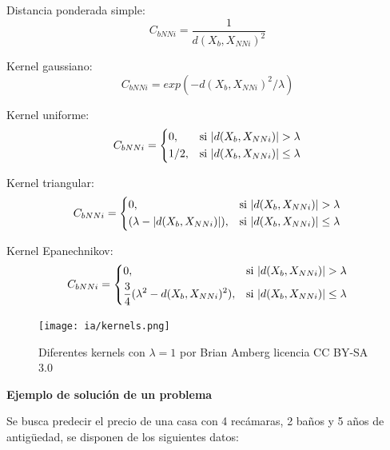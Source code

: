 \documentclass[11pt,fleqn]{book} %
\begin{document}
\begin{itemize}
Distancia ponderada simple:
\begin{equation}
C_{bNNi}=\frac{1}{d(X_b,X_{NNi})^2} 
\end{equation}

Kernel gaussiano:
\begin{equation}
C_{bNNi}=exp( -d(X_b,X_{NNi})^2 / \lambda)
\end{equation}

Kernel uniforme:
\begin{equation}
    C_{bNNi} = 
\begin{dcases}
    0,& \text{si } |d(X_b,X_{NNi})| > \lambda\\
    1/2,& \text{si } |d(X_b,X_{NNi})| \leq  \lambda
\end{dcases} 
\end{equation}

Kernel triangular:
\begin{equation}
    C_{bNNi} = 
\begin{dcases}
    0,& \text{si } |d(X_b,X_{NNi})| > \lambda\\
    (\lambda - |d(X_b,X_{NNi})|) ,& \text{si } |d(X_b,X_{NNi})| \leq  \lambda
\end{dcases} 
\end{equation}

Kernel Epanechnikov:
\begin{equation}
    C_{bNNi} = 
\begin{dcases}
    0,& \text{si } |d(X_b,X_{NNi})| > \lambda\\
    \frac{3}{4}(\lambda^2 - d(X_b,X_{NNi})^2) ,& \text{si } |d(X_b,X_{NNi})| \leq  \lambda
\end{dcases} 
\end{equation}

\begin{figure}[ht]
\centering\texttt{[image: ia/kernels.png]}
\caption{Diferentes kernels con $\lambda= 1$ por Brian Amberg licencia CC BY-SA 3.0}

\label{fig:kernels_knn} 
\end{figure}

\end{itemize}

\textbf{Ejemplo de solución de un problema}

Se busca predecir el precio de una casa con 4 recámaras, 2 baños y 5 años de antigüedad, se disponen de los siguientes datos:
\end{document}
